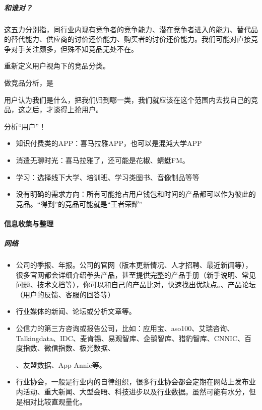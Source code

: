 \documentclass[letterpaper,11pt,english]{sphinxmanual}
\begin{document}
\subparagraph{和谁对？}
\label{\detokenize{chapter_knowledge/goods_analysis:id11}}
这五力分别指，同行业内现有竞争者的竞争能力、潜在竞争者进入的能力、替代品的替代能力、供应商的讨价还价能力、购买者的讨价还价能力。我们可能对直接竞争对手关注颇多，但殊不知竞品无处不在。

重新定义用户视角下的竞品分类。

做竞品分析，是

用户认为我们是什么，把我们归到哪一类，我们就应该在这个范围内去找自己的竞品，这之后，才谈得上抢用户。

分析“用户”！
\begin{itemize}
\item {} 
知识付费类的APP：喜马拉雅APP，也可以是混沌大学APP

\item {} 
消遣无聊时光：喜马拉雅了，还可能是花椒、蜻蜓FM。

\item {} 
学习：选择线下大学、培训班、学习类图书、音像制品等等

\item {} 
没有明确的需求方向：所有可能抢占用户钱包和时间的产品都可以作为彼此的竞品。“得到”的竞品可能就是“王者荣耀”

\end{itemize}


\paragraph{信息收集与整理}
\label{\detokenize{chapter_knowledge/goods_analysis:id12}}

\subparagraph{网络}
\label{\detokenize{chapter_knowledge/goods_analysis:id13}}\begin{itemize}
\item {} 
公司的季报、年报。公司的官网（版本更新情况、人才招聘、最近新闻等），很多官网都会详细介绍拳头产品，甚至提供完整的产品手册（新手说明、常见问题、技术文档等），你可以和自己的产品比对，快速找出优缺点。、产品论坛（用户的反馈、客服的回答等）

\item {} 
行业媒体的新闻、论坛或分析文章等。

\item {} 
公信力的第三方咨询或报告公司，比如：应用宝、aso100、艾瑞咨询、Talkingdata、IDC、麦肯锡、易观智库、企鹅智库、猎豹智库、CNNIC、百度指数、微信指数、极光数据、%
\begin{footnote}[453]\sphinxAtStartFootnote
{}
%
\end{footnote}、友盟数据、App
Annie等。

\item {} 
行业协会，一般是行业内的自律组织，很多行业协会都会定期在网站上发布业内活动、重大新闻、大型会晤、科技进步以及行业数据。虽然可能有水分，但是相对比较直观量化。

\end{itemize}
\end{document}
